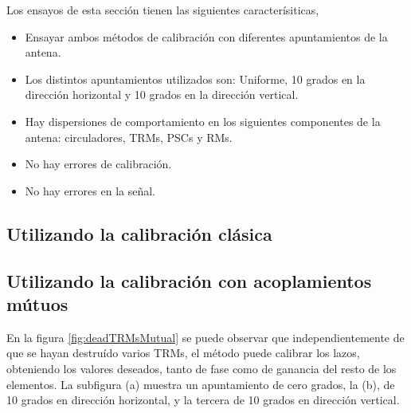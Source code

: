 Los ensayos de esta sección tienen las siguientes caracterísiticas,
\begin{itemize}
	\item Ensayar ambos métodos de calibración con diferentes apuntamientos de la antena.
	\item Los distintos apuntamientos utilizados son: Uniforme, 10 grados en la dirección horizontal y 10 grados en la dirección 
		vertical.
	\item Hay dispersiones de comportamiento en los siguientes componentes de la antena: circuladores, TRMs, PSCs y RMs.
	\item No hay errores de calibración.
	\item No hay errores en la señal.
\end{itemize}

\subsection{Utilizando la calibración clásica}
\subsection{Utilizando la calibración con acoplamientos mútuos}

En la figura \ref{fig:deadTRMsMutual} se puede observar que independientemente de que se hayan destruído varios TRMs, el 
método puede calibrar los lazos, obteniendo los valores deseados, tanto de fase como de ganancia del resto de los elementos.
La subfigura (a) muestra un apuntamiento de cero grados, la (b), de 10 grados en dirección horizontal, y la tercera de 10 grados
en dirección vertical.

